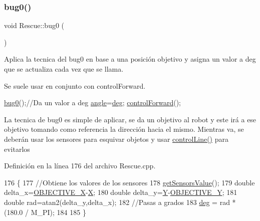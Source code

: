 \subsubsection{\texorpdfstring{bug0()}{bug0()}}
{\footnotesize\ttfamily void Rescue\+::bug0 (\begin{DoxyParamCaption}{ }\end{DoxyParamCaption})}



Aplica la tecnica del bug0 en base a una posición objetivo y asigna un valor a deg que se actualiza cada vez que se llama. 

Se suele usar en conjunto con control\+Forward. 
\begin{DoxyCode}
\hyperlink{classRescue_a4e3ec37a662b2cb91df3dcb0a875acf9_a4e3ec37a662b2cb91df3dcb0a875acf9}{bug0}();\textcolor{comment}{//Da un valor a deg}
\hyperlink{classRescue_a5bb8010f938dbe020a183b486772afe4_a5bb8010f938dbe020a183b486772afe4}{angle}=\hyperlink{classRescue_ad6febda0e181e1b6847e1b9be0f54e2b_ad6febda0e181e1b6847e1b9be0f54e2b}{deg};
\hyperlink{classRescue_a47bd9c67c0e779f2dbf9ce6e5f81b831_a47bd9c67c0e779f2dbf9ce6e5f81b831}{controlForward}();
\end{DoxyCode}
 La tecnica de bug0 es simple de aplicar, se da un objetivo al robot y este irá a ese objetivo tomando como referencia la dirección hacia el mismo. Mientras va, se deberán usar los sensores para esquivar objetos y usar \hyperlink{classRescue_aeef91de334e7779ce2fb2c2b57cd70c3_aeef91de334e7779ce2fb2c2b57cd70c3}{control\+Line()} para evitarlos 

Definición en la línea 176 del archivo Rescue.\+cpp.


\begin{DoxyCode}
176                  \{
177     \textcolor{comment}{//Obtiene los valores de los sensores}
178     \hyperlink{classRescue_a68675aa6bb37102baf46803451e16c82_a68675aa6bb37102baf46803451e16c82}{getSensorsValue}();
179     \textcolor{keywordtype}{double} delta\_x=\hyperlink{classRescue_a8a98fdaa1deed080b4f8798f769f46cc_a8a98fdaa1deed080b4f8798f769f46cc}{OBJECTIVE\_X}-\hyperlink{classRescue_ab2a4cd163b6619df49346383bb08d365_ab2a4cd163b6619df49346383bb08d365}{X};
180     \textcolor{keywordtype}{double} delta\_y=\hyperlink{classRescue_aefe62362f68d14dc3f9234791de23882_aefe62362f68d14dc3f9234791de23882}{Y}-\hyperlink{classRescue_a54840a89d4f27081c433d70e1a78022f_a54840a89d4f27081c433d70e1a78022f}{OBJECTIVE\_Y};
181     \textcolor{keywordtype}{double} rad=atan2(delta\_y,delta\_x);
182     \textcolor{comment}{//Pasas a grados}
183     \hyperlink{classRescue_ad6febda0e181e1b6847e1b9be0f54e2b_ad6febda0e181e1b6847e1b9be0f54e2b}{deg} = rad * (180.0 / M\_PI);
184     
185 \}
\end{DoxyCode}
\mbox{\label{classRescue_a8fca4fbd58ec9ccab6fc88424b16723f_a8fca4fbd58ec9ccab6fc88424b16723f}} 

